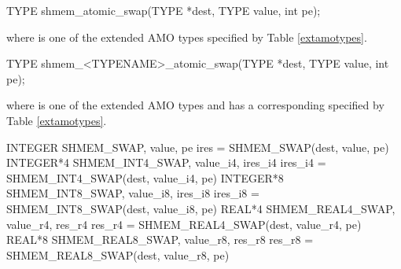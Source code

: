 
\begin{apidefinition}

\begin{C11synopsis}
TYPE shmem_atomic_swap(TYPE *dest, TYPE value, int pe);
\end{C11synopsis}
where \TYPE{} is one of the extended \ac{AMO} types specified by Table \ref{extamotypes}.

\begin{Csynopsis}
TYPE shmem_<TYPENAME>_atomic_swap(TYPE *dest, TYPE value, int pe);
\end{Csynopsis}
where \TYPE{} is one of the extended \ac{AMO} types and has a corresponding \TYPENAME{} specified by Table \ref{extamotypes}.

\begin{Fsynopsis}
INTEGER SHMEM_SWAP, value, pe
ires = SHMEM_SWAP(dest, value, pe)
INTEGER*4 SHMEM_INT4_SWAP, value_i4, ires_i4
ires_i4 = SHMEM_INT4_SWAP(dest, value_i4, pe)
INTEGER*8 SHMEM_INT8_SWAP, value_i8, ires_i8
ires_i8 = SHMEM_INT8_SWAP(dest, value_i8, pe)
REAL*4 SHMEM_REAL4_SWAP, value_r4, res_r4
res_r4 = SHMEM_REAL4_SWAP(dest, value_r4, pe)
REAL*8 SHMEM_REAL8_SWAP, value_r8, res_r8
res_r8 = SHMEM_REAL8_SWAP(dest, value_r8, pe)
\end{Fsynopsis}

\begin{apiarguments}
\end{apiarguments}





\end{apidefinition}
